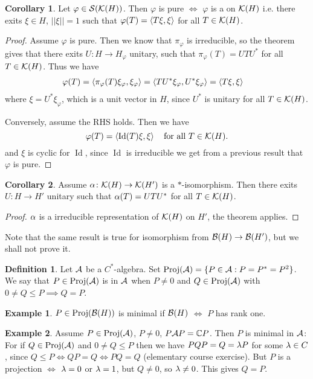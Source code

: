 \documentclass[10pt,english,a4paper]{article}
\theoremstyle{definition}
\newtheorem*{definition}{Definition}
\newtheorem*{corollary}{Corollary}
\newtheorem*{example}{Example}
\let\emph\relax %
\def\pivp{\pi_{\vphi}}
\def\Hvp{H_{\vphi}}
\def\xivp{\xi_{\vphi}}
\DeclareMathOperator{\Proj}{Proj}
\DeclareMathOperator{\Id}{Id}
\def\vphi{\varphi}
\begin{document}
\begin{corollary}
    Let $\varphi \in \mathcal{S}(\mathcal{K}(H))$. Then $\vphi$ is pure $\iff$ $\vphi$ is a \emph{vector state}
on $\mathcal{K}(H)$ i.e. there exits $\xi \in H$, $||\xi||=1$ such that $\vphi(T) = \ind{T\xi,\xi}$
for all $T \in \mathcal{K}(H)$.
\end{corollary}
\begin{proof}
    Assume $\vphi$ is pure. Then we know that $\pi_{\vphi}$ is irreducible, so the 
theorem gives that there exits $U\colon H\to \Hvp$ unitary, such that 
$\pivp (T) = UTU^*$ for all $T \in \mathcal{K}(H)$.
Thus we have 
\begin{align*}
    \vphi(T) &= \ind{\pivp(T)\xivp, \xivp} = \ind{TU^*\xivp, U^*\xivp} = 
\ind{T\xi, \xi}
\end{align*}
where $\xi = U^*\xivp$, which is a unit vector in $H$, since $U^*$ is unitary
for all $T\in \mathcal{K}(H)$. 

Conversely, assume the RHS holds. Then we have 
\[ \vphi(T) = \ind{\Id(T)\xi,\xi}\quad\text{for all } T \in \Ks(H).\]
and $\xi$ is cyclic for $\Id$, since $\Id$ is irreducible we get from a
previous result that $\vphi$ is pure.
\end{proof}

\begin{corollary}
    Assume $\alpha\colon \mathcal{K}(H)\to \mathcal{K}(H')$ is a $*$-isomorphism. Then there exits 
$U\colon H\to H'$ unitary such that 
$\alpha(T) = UTU^*$ for all $T \in \mathcal{K}(H)$.
\end{corollary}
\begin{proof}
    $\alpha$ is a irreducible representation of $\mathcal{K}(H)$ on $H'$, the theorem applies. 
\end{proof}

Note that the same result is true for isomorphism from $\mathcal{B}(H)\to \mathcal{B}(H')$, 
but we shall not prove it. 

\begin{definition}
Let $\mathcal{A}$ be a $C^*$-algebra. Set $\Proj(\As) =\{P\in \As: P=P^*=P^2\}$.
We say that $P\in \Proj(\As)$ is \emph{minimal} in $\mathcal{A}$ when $P\neq 0$
and $Q \in \Proj(\As)$ with $0\neq Q \leq P \implies Q = P$.
\end{definition}

\begin{example}
    $P\in \Proj(\Bs(H))$ is minimal if $\mathcal{B}(H)$ $\iff$ $P$ has rank one.
\end{example}
\begin{example}
    Assume $P\in \Proj(\As)$, $P\neq 0$, $P\mathcal{A} P = \mathbb{C} P$. Then $P$ is minimal 
in $\mathcal{A}$: For if $Q \in \Proj(\As)$ and $0\neq Q\leq P$ then we have $PQP = Q =\lambda P$
for some $\lambda \in C$, since $Q\leq P \iff QP =Q \iff PQ =Q$ (elementary course exercise).
But $P$ is a projection $\iff$ $\lambda = 0$ or $\lambda =1$, but $Q\neq 0$, so $\lambda \neq 0$. This gives 
$Q = P$.
\end{example}
\end{document}
